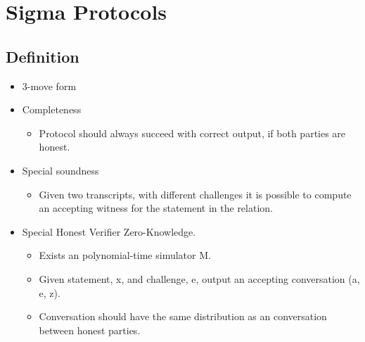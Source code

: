 \chapter{Sigma Protocols}
\label{ch:sigma_protocols}

\section{Definition}
\label{sec:sigma_definition}
\begin{itemize}
  \item 3-move form
  \item Completeness
    \begin{itemize}
      \item Protocol should always succeed with correct output, if both parties are honest.
    \end{itemize}
  \item Special soundness
    \begin{itemize}
      \item Given two transcripts, with different challenges it is possible to
        compute an accepting witness for the statement in the relation.
    \end{itemize}
  \item Special Honest Verifier Zero-Knowledge.
    \begin{itemize}
      \item Exists an polynomial-time simulator M.
      \item Given statement, x, and challenge, e, output an accepting
        conversation (a, e, z).
      \item Conversation should have the same distribution as an conversation
        between honest parties.
    \end{itemize}
\end{itemize}



